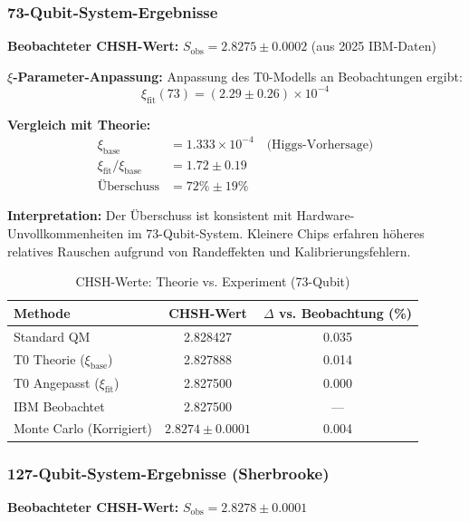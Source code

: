 \subsubsection{73-Qubit-System-Ergebnisse}

\textbf{Beobachteter CHSH-Wert:} $S_{\text{obs}} = 2.8275 \pm 0.0002$ (aus 2025 IBM-Daten)

\textbf{$\xi$-Parameter-Anpassung:}
Anpassung des T0-Modells an Beobachtungen ergibt:
\begin{equation}
	\xi_{\text{fit}}(73) = (2.29 \pm 0.26) \times 10^{-4}
\end{equation}

\textbf{Vergleich mit Theorie:}
\begin{align}
	\xi_{\text{base}} &= 1.333 \times 10^{-4} \quad \text{(Higgs-Vorhersage)} \\
	\xi_{\text{fit}} / \xi_{\text{base}} &= 1.72 \pm 0.19 \\
	\text{Überschuss} &= 72\% \pm 19\%
\end{align}

\textbf{Interpretation:} Der Überschuss ist konsistent mit Hardware-Unvollkommenheiten im 73-Qubit-System. Kleinere Chips erfahren höheres relatives Rauschen aufgrund von Randeffekten und Kalibrierungsfehlern.

\begin{table}[h]
	\centering
	\caption{CHSH-Werte: Theorie vs. Experiment (73-Qubit)}
	\label{tab:chsh_73}
	\begin{tabular}{@{}lcc@{}}
		\toprule
		Methode & CHSH-Wert & $\Delta$ vs. Beobachtung (\%) \\
		\midrule
		Standard QM & 2.828427 & 0.035 \\
		T0 Theorie ($\xi_{\text{base}}$) & 2.827888 & 0.014 \\
		T0 Angepasst ($\xi_{\text{fit}}$) & 2.827500 & 0.000 \\
		IBM Beobachtet & 2.827500 & --- \\
		Monte Carlo (Korrigiert) & $2.8274 \pm 0.0001$ & 0.004 \\
		\bottomrule
	\end{tabular}
\end{table}

\subsubsection{127-Qubit-System-Ergebnisse (Sherbrooke)}

\textbf{Beobachteter CHSH-Wert:} $S_{\text{obs}} = 2.8278 \pm 0.0001$

